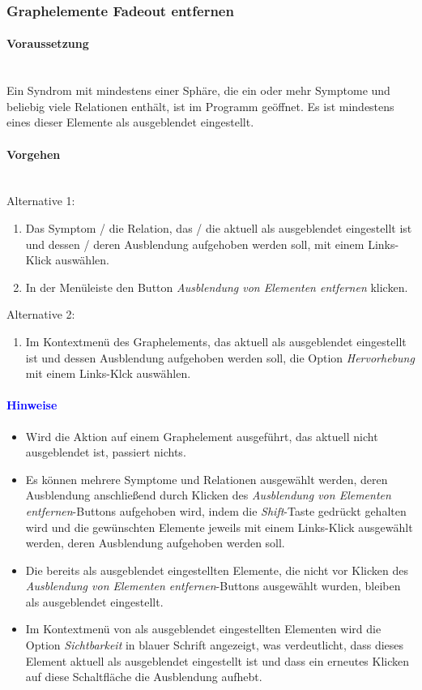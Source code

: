 \documentclass[enabledeprecatedfontcommands,fontsize=11pt,paper=a4,twoside]{scrartcl}
\newcounter{one}
\newcommand*{\hint}{\paragraph{\textcolor{blue}{Hinweise}}}
\newcommand*{\condition}{\paragraph{Voraussetzung}$\;$ \vspace{0.2cm}\\}
\newcommand*{\actions}{\paragraph{Vorgehen} $\;$\vspace{0.2cm}\\}
\begin{document}
		\subsubsection{Graphelemente Fadeout entfernen}
			\condition 	
		Ein Syndrom mit mindestens einer Sphäre, die ein oder mehr Symptome und beliebig viele Relationen enthält, ist im Programm geöffnet. Es ist mindestens eines dieser Elemente als ausgeblendet eingestellt.
		\actions
		Alternative 1:
		\begin{enumerate}
			\item Das Symptom / die Relation, das / die aktuell als ausgeblendet eingestellt ist und dessen / deren Ausblendung aufgehoben werden soll, mit einem Links-Klick auswählen. 
			\item In der Menüleiste den Button \textit{Ausblendung von Elementen entfernen} klicken.
		\end{enumerate}
				Alternative 2:
		\begin{enumerate}
			\item Im Kontextmenü des Graphelements, das aktuell als ausgeblendet eingestellt ist und dessen Ausblendung aufgehoben werden soll, die Option \textit{Hervorhebung} mit einem Links-Klck auswählen.
		\end{enumerate}
		\hint
		\begin{itemize}
				\item Wird die Aktion auf einem Graphelement ausgeführt, das aktuell nicht ausgeblendet ist, passiert nichts.
					\item Es können mehrere Symptome und Relationen ausgewählt werden, deren Ausblendung anschließend durch Klicken des \textit{Ausblendung von Elementen entfernen}-Buttons aufgehoben wird, indem die \textit{Shift}-Taste gedrückt gehalten wird und die gewünschten Elemente jeweils mit einem Links-Klick ausgewählt werden, deren Ausblendung aufgehoben werden soll.
					\item Die bereits als ausgeblendet eingestellten Elemente, die nicht vor Klicken des \textit{Ausblendung von Elementen entfernen}-Buttons ausgewählt wurden, bleiben als ausgeblendet eingestellt.
					\item Im Kontextmenü von als ausgeblendet eingestellten Elementen wird die Option \textit{Sichtbarkeit} in blauer Schrift angezeigt, was verdeutlicht, dass dieses Element aktuell als ausgeblendet eingestellt ist und dass ein erneutes Klicken auf diese Schaltfläche die Ausblendung aufhebt.
		\end{itemize}
		
\end{document}

